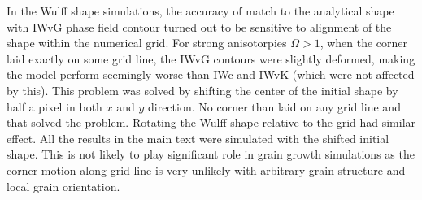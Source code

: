 In the Wulff shape simulations, the accuracy of match to the analytical shape with IWvG phase field contour turned out to be sensitive to alignment of the shape within the numerical grid. For strong anisotorpies $\Omega>1$, when the corner laid exactly on some grid line, the IWvG contours were slightly deformed, making the model perform seemingly worse than IWc and IWvK (which were not affected by this). This problem was solved by shifting the center of the initial shape by half a pixel in both $x$ and $y$ direction. No corner than laid on any grid line and that solved the problem. Rotating the Wulff shape relative to the grid had similar effect. All the results in the main text were simulated with the shifted initial shape. This is not likely to play significant role in grain growth simulations as the corner motion along grid line is very unlikely with arbitrary grain structure and local grain orientation.

